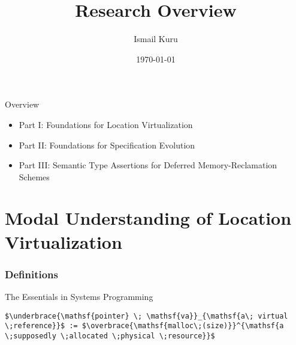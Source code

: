 \documentclass[aspectratio=169,xcolor=dvipsnames]{beamer}
\title{Research Overview}
\subtitle{}
\author{Ismail Kuru}
\institute
{
    Department of Computer Science \\
    Drexel University %
}
\date{\today} %
\newcommand{\makepart}[1]{ %
\part{#1} \frame{\partpage}
}
\begin{document}
\begin{frame}
    \titlepage
\end{frame}

\begin{frame}{Overview}
\begin{itemize}
    \item Part I: Foundations for Location Virtualization
    \item Part II: Foundations for Specification Evolution
    \item Part III: Semantic Type Assertions for Deferred Memory-Reclamation Schemes
\end{itemize}


\end{frame}

\makepart{Modal Understanding of Location Virtualization}


\section{Definitions}

\begin{frame}[fragile]{The Essentials in Systems Programming}
\begin{lstlisting}[style=CStyle,mathescape]
    $\underbrace{\mathsf{pointer} \; \mathsf{va}}_{\mathsf{a\; virtual \;reference}}$ := $\overbrace{\mathsf{malloc\;(size)}}^{\mathsf{a \;supposedly \;allocated \;physical \;resource}}$
\end{lstlisting}
\end{frame}
\end{document}
